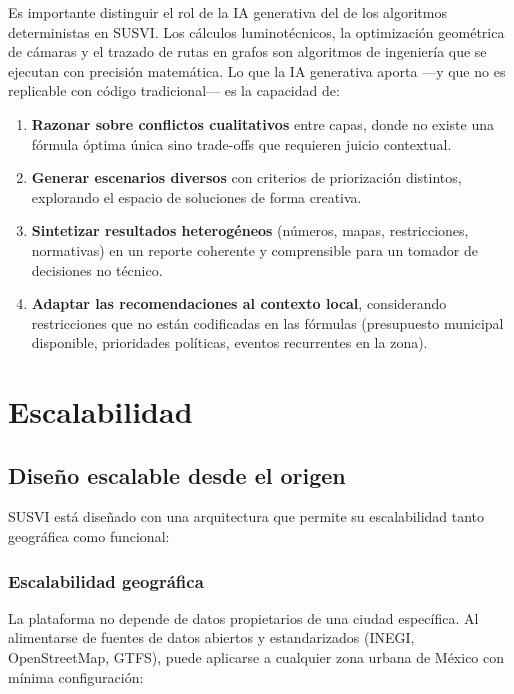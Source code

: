 \documentclass[12pt,a4paper]{article}
\begin{document}
Es importante distinguir el rol de la IA generativa del de los algoritmos deterministas en SUSVI. Los cálculos luminotécnicos, la optimización geométrica de cámaras y el trazado de rutas en grafos son algoritmos de ingeniería que se ejecutan con precisión matemática. Lo que la IA generativa aporta —y que no es replicable con código tradicional— es la capacidad de:

\begin{enumerate}[label=\alph*)]
    \item \textbf{Razonar sobre conflictos cualitativos} entre capas, donde no existe una fórmula óptima única sino trade-offs que requieren juicio contextual.
    \item \textbf{Generar escenarios diversos} con criterios de priorización distintos, explorando el espacio de soluciones de forma creativa.
    \item \textbf{Sintetizar resultados heterogéneos} (números, mapas, restricciones, normativas) en un reporte coherente y comprensible para un tomador de decisiones no técnico.
    \item \textbf{Adaptar las recomendaciones al contexto local}, considerando restricciones que no están codificadas en las fórmulas (presupuesto municipal disponible, prioridades políticas, eventos recurrentes en la zona).
\end{enumerate}


\section{Escalabilidad}

\subsection{Diseño escalable desde el origen}

SUSVI está diseñado con una arquitectura que permite su escalabilidad tanto geográfica como funcional:

\subsubsection{Escalabilidad geográfica}

La plataforma no depende de datos propietarios de una ciudad específica. Al alimentarse de fuentes de datos abiertos y estandarizados (INEGI, OpenStreetMap, GTFS), puede aplicarse a cualquier zona urbana de México con mínima configuración:
\end{document}
